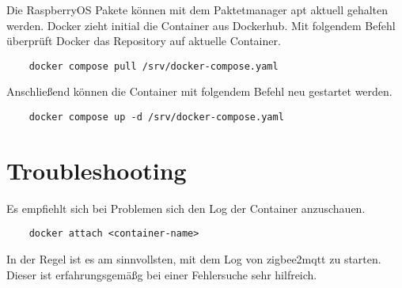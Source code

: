 Die RaspberryOS Pakete können mit dem Paktetmanager apt aktuell gehalten werden. Docker zieht initial die Container aus Dockerhub.
Mit folgendem Befehl überprüft Docker das Repository auf aktuelle Container.

\begin{lstlisting}
    docker compose pull /srv/docker-compose.yaml
\end{lstlisting}

Anschließend können die Container mit folgendem Befehl neu gestartet werden.

\begin{lstlisting}
    docker compose up -d /srv/docker-compose.yaml
\end{lstlisting}

\section{Troubleshooting}

Es empfiehlt sich bei Problemen sich den Log der Container anzuschauen.

\begin{lstlisting}
    docker attach <container-name>
\end{lstlisting}

In der Regel ist es am sinnvollsten, mit dem Log von zigbee2mqtt zu starten. Dieser ist erfahrungsgemäßg bei einer Fehlersuche sehr hilfreich.







